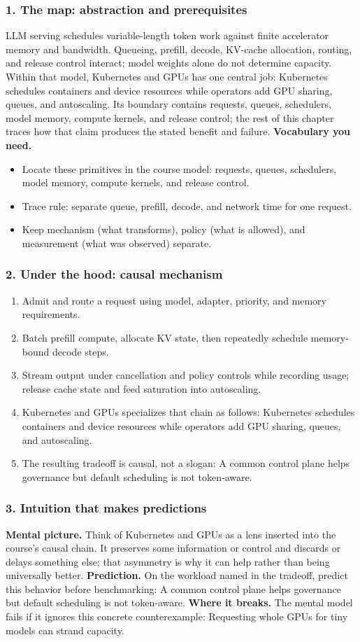 \subsubsection*{1. The map: abstraction and prerequisites}
LLM serving schedules variable-length token work against finite accelerator memory and bandwidth. Queueing, prefill, decode, KV-cache allocation, routing, and release control interact; model weights alone do not determine capacity.
Within that model, Kubernetes and GPUs has one central job: Kubernetes schedules containers and device resources while operators add GPU sharing, queues, and autoscaling. Its boundary contains requests, queues, schedulers, model memory, compute kernels, and release control; the rest of this chapter traces how that claim produces the stated benefit and failure.
\textbf{Vocabulary you need.}\begin{itemize}
\item Locate these primitives in the course model: requests, queues, schedulers, model memory, compute kernels, and release control.
\item Trace rule: separate queue, prefill, decode, and network time for one request.
\item Keep mechanism (what transforms), policy (what is allowed), and measurement (what was observed) separate.
\end{itemize}
\subsubsection*{2. Under the hood: causal mechanism}\begin{enumerate}
\item Admit and route a request using model, adapter, priority, and memory requirements.
\item Batch prefill compute, allocate KV state, then repeatedly schedule memory-bound decode steps.
\item Stream output under cancellation and policy controls while recording usage; release cache state and feed saturation into autoscaling.
\item Kubernetes and GPUs specializes that chain as follows: Kubernetes schedules containers and device resources while operators add GPU sharing, queues, and autoscaling.
\item The resulting tradeoff is causal, not a slogan: A common control plane helps governance but default scheduling is not token-aware.
\end{enumerate}
\subsubsection*{3. Intuition that makes predictions}
\textbf{Mental picture.} Think of Kubernetes and GPUs as a lens inserted into the course's causal chain. It preserves some information or control and discards or delays something else; that asymmetry is why it can help rather than being universally better.
\textbf{Prediction.} On the workload named in the tradeoff, predict this behavior before benchmarking: A common control plane helps governance but default scheduling is not token-aware.
\textbf{Where it breaks.} The mental model fails if it ignores this concrete counterexample: Requesting whole GPUs for tiny models can strand capacity.
